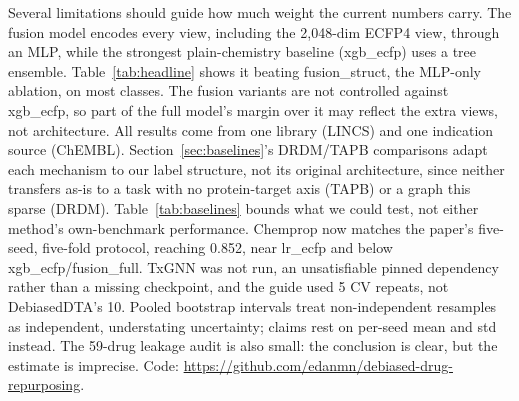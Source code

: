 \documentclass{llncs}
\begin{document}
Several limitations should guide how much weight the current numbers carry. The fusion model encodes every view, including the 2{,}048-dim ECFP4 view, through an MLP, while the strongest plain-chemistry baseline (xgb\_ecfp) uses a tree ensemble. Table~\ref{tab:headline} shows it beating fusion\_struct, the MLP-only ablation, on most classes. The fusion variants are not controlled against xgb\_ecfp, so part of the full model's margin over it may reflect the extra views, not architecture. All results come from one library (LINCS) and one indication source (ChEMBL). Section~\ref{sec:baselines}'s DRDM/TAPB comparisons adapt each mechanism to our label structure, not its original architecture, since neither transfers as-is to a task with no protein-target axis (TAPB) or a graph this sparse (DRDM). Table~\ref{tab:baselines} bounds what we could test, not either method's own-benchmark performance. Chemprop now matches the paper's five-seed, five-fold protocol, reaching 0.852, near lr\_ecfp and below xgb\_ecfp/fusion\_full. TxGNN was not run, an unsatisfiable pinned dependency rather than a missing checkpoint, and the guide used 5 CV repeats, not DebiasedDTA's 10. Pooled bootstrap intervals treat non-independent resamples as independent, understating uncertainty; claims rest on per-seed mean and std instead. The 59-drug leakage audit is also small: the conclusion is clear, but the estimate is imprecise. Code: \url{https://github.com/edanmn/debiased-drug-repurposing}.



\end{document}
